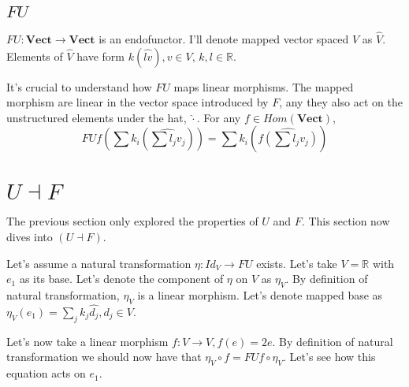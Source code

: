 \documentclass[12pt]{article}
\newcommand{\R}{\mathbb{R}}
\newcommand{\Vect}{\mathbf{Vect}}
\begin{document}
\subsection{$FU$}

$FU: \Vect \rightarrow \Vect$ is an endofunctor. I'll denote mapped vector
spaced $V$ as $\hat{V}$.  Elements of $\hat{V}$ have form $k(\hat{lv}), v \in
V, \, k, l \in \R$.

It's crucial to understand how $FU$ maps linear morphisms. The mapped morphism are linear in the vector space introduced by $F$, any they also act on the unstructured elements under the hat, $\hat{\cdot}$.
For any $f \in Hom(\Vect)$,
\[FUf\left(\sum k_i(\widehat{\sum l_j v_j})\right)
= \sum k_i \left(
                 \widehat{f \left(\sum l_j v_j \right)}
           \right) \]

\section{$U \dashv F$}

The previous section only explored the properties of $U$ and $F$. This section now dives into $(U \dashv F)$.


Let's assume a natural transformation $\eta: Id_V \rightarrow FU$ exists. Let's
take $V = \R$ with $e_1$ as its base.
Let's denote the component of $\eta$ on $V$ as $\eta_V$.
By definition of natural transformation, $\eta_V$ is a linear morphism. Let's
denote mapped base as $\eta_V(e_1) = \sum_j  k_{j}\hat{d_{j}}, d_{j} \in V$.

Let's now take a linear morphism $f: V \rightarrow V, f(e) = 2e$.
By definition of natural transformation we should now have that $\eta_V \circ f
= FUf \circ \eta_V$. Let's see how this equation acts on $e_1$.
\end{document}
